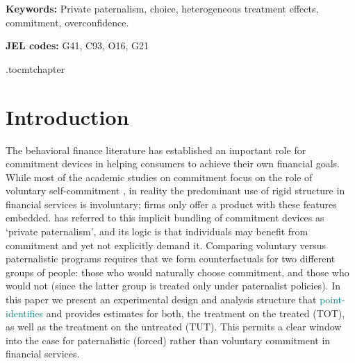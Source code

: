 \documentclass[oneside,11pt]{article}
\begin{document}
\vspace{.3in}

\textbf{Keywords: } Private paternalism, choice, heterogeneous treatment effects, commitment, overconfidence.

\textbf{JEL codes:} G41, C93, O16, G21

\newpage

\etocdepthtag.toc{mtchapter}





\section{Introduction}

The behavioral finance literature has established an important role for commitment devices in helping consumers to achieve their own financial goals.  While most of the academic studies on commitment focus on the role of voluntary self-commitment \citep{thaler2004save, prina2015banking, brune2016facilitating, callen2019headwaters, Pascaline, Ashraf}, in reality the predominant use of rigid structure in financial services is involuntary; firms only offer a product with these features embedded.  \cite{Laibson2018} has referred to this implicit bundling of commitment devices as ‘private paternalism’, and its logic is that individuals may benefit from commitment and yet not explicitly demand it.  Comparing voluntary versus paternalistic programs requires that we form counterfactuals for two different groups of people: those who would naturally choose commitment, and those who would not (since the latter group is treated only under paternalist policies). In this paper we present an experimental design and analysis structure that \textcolor{teal}{point-identifies} and provides estimates for both, the treatment on the treated (TOT), as well as the treatment on the untreated (TUT). This permits a clear window into the case for paternalistic (forced) rather than voluntary commitment in financial services.
\end{document}
